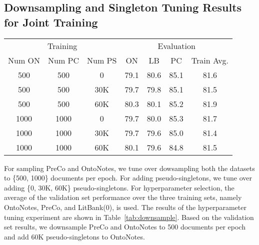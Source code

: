 \documentclass[12pt]{thesis-umich}[thesis]
\begin{document}
\subsection{Downsampling and Singleton Tuning Results for Joint Training}
\label{sec:downsampling joint}
\begin{table*}[h]
    \centering
    \small
    \begin{tabular}{ccccccc}
    \toprule
        \multicolumn{3}{c}{Training} & \multicolumn{4}{c}{Evaluation} \\
        Num ON & Num PC & Num PS & ON & LB & PC & Train Avg.\\
    \midrule
        
        \phantom{1}500 & \phantom{1}500 & \phantom{11}0 & 
        79.1 & 80.6 & 85.1 &  81.6 \\
        
        \phantom{1}500 & \phantom{1}500 & 30K  & 
        79.7 & 79.8 & 85.1 &  81.5 \\
        
        \phantom{1}500 & \phantom{1}500 & 60K  & 
        80.3 & 80.1 & 85.2 &  81.9 \\
        
        1000 & 1000 & \phantom{1}0 & 
        79.7 & 80.0 & 85.3 &  81.7 \\
        
        1000 & 1000 & 30K & 
        79.7 & 79.6 & 85.0 &  81.4 \\
        
        1000 & 1000 & 60K & 
        80.1 & 79.6 & 84.8 &  81.5 \\
        
    \bottomrule
    
    \end{tabular}
    \caption{Validation set performance for the training set datasets when downsampling OntoNotes (ON) and PreCo (PC) in joint training.}
    \label{tab:downsample}
\end{table*}




 


For sampling PreCo and OntoNotes, we tune over dowsampling both the datasets to \{500, 1000\} documents per epoch. For adding pseudo-singletons, we tune over adding  \{0, 30K, 60K\} pseudo-singletons. For hyperparameter selection, the average of the validation set performance over the three training sets, namely OntoNotes, PreCo, and LitBank(0), is used. The results of the hyperparameter tuning experiment are shown in Table~\ref{tab:downsample}. Based on the validation set results, we downsample PreCo and OntoNotes to 500 documents per epoch and add 60K pseudo-singletons to OntoNotes. 
\end{document}
